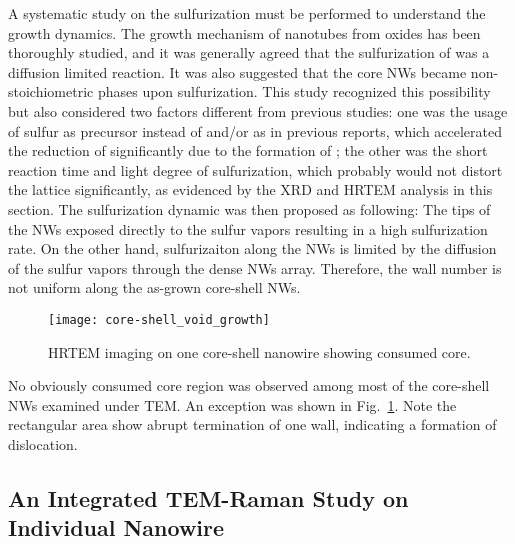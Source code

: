 A systematic study on the sulfurization must be performed to understand the growth dynamics. The growth mechanism of  nanotubes from oxides has been thoroughly studied,\cite{Feldman1998} and it was generally agreed that the sulfurization of  was a diffusion limited reaction.\cite{Feldman1996} It was also suggested that the core  NWs became non-stoichiometric phases upon sulfurization.\cite{Feldman1996,ZAK2009} This study recognized this possibility but also considered two factors different from previous studies: one was the usage of sulfur as precursor instead of  and/or  as in previous reports, which accelerated the reduction of  significantly due to the formation of ; the other was the short reaction time and light degree of sulfurization, which probably would not distort the  lattice significantly, as evidenced by the XRD and HRTEM analysis in this section. The sulfurization dynamic was then proposed as following: The tips of the NWs exposed directly to the sulfur vapors resulting in a high sulfurization rate. On the other hand,  sulfurizaiton along the NWs is limited by the diffusion of the sulfur vapors through the dense NWs array. Therefore, the  wall number is not uniform along the as-grown core-shell NWs.

\begin{figure}[htb]
\centering
\texttt{[image: core-shell\_void\_growth]}
\caption[HRTEM imaging on one nanowire showing consumed core]{HRTEM imaging on one core-shell nanowire showing consumed core.}
\label{fig:ch5ws2tem2}
\end{figure}
No obviously consumed core region was observed among most of the core-shell NWs examined under TEM. An exception was shown in Fig.~\ref{fig:ch5ws2tem2}. Note the rectangular area show abrupt termination of one  wall, indicating a formation of dislocation.


\subsection{An Integrated TEM-Raman Study on Individual Nanowire}\label{tms:raman} 

